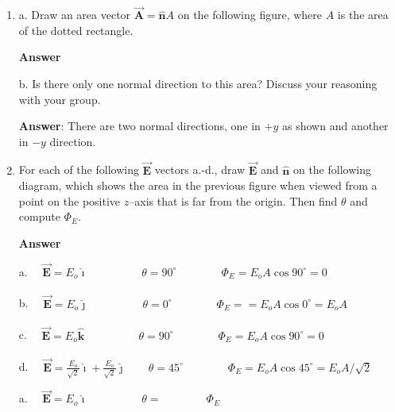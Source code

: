 \documentclass{article}
\newcommand{\ds}[0]{\displaystyle}
\newcommand{\ihat}[0]{\hat{\boldsymbol{\imath}}}
\newcommand{\jhat}[0]{\hat{\boldsymbol{\jmath}}}
\newcommand{\khat}[0]{\hat{\boldsymbol{k}}}
\newcommand{\bfvec}[1]{\vec{\mathbf{#1}}}
\begin{document}
\begin{enumerate}

  \item a. Draw an area vector $\bfvec{A}=\hat{\mathbf{n}}A$ on the following figure, where $A$ is the area of the dotted rectangle.

        \ifsolutions
        \textbf{Answer}

        
        \else

        
        \fi
        \ifsolutions\else
        
        \fi

        b. Is there only one normal direction to this area? Discuss your reasoning with your group.

        \ifsolutions
        \textbf{Answer}: There are two normal directions, one in $+y$ as shown and another in $-y$ direction.
        \else
        \vskip 72pt
        \fi
        \ifsolutions\else
        \vskip 72pt
        \fi

  \item For each of the following $\bfvec{E}$ vectors a.-d., draw $\bfvec{E}$ and $\hat{\mathbf{n}}$ on the following diagram, which shows the area in the previous figure when viewed from a point on the positive $z$--axis that is far from the origin. Then find $\theta$ and compute $\Phi_E$.

        \ifsolutions
        \textbf{Answer}

        

        a. $\quad\ds\bfvec{E}=E_o\ihat\qquad\phantom{+\frac{E_o}{\sqrt{2}}\jhat}\theta=90^\circ\qquad\qquad\Phi_E=E_oA\cos 90^\circ = 0$

        b. $\quad\ds\bfvec{E}=E_o\jhat\qquad\phantom{+ \frac{E_o}{\sqrt{2}}\jhat}\theta=0^\circ\qquad\qquad\Phi_E==E_oA\cos 0^\circ=E_oA$ 

        c. $\quad\ds\bfvec{E}=E_o\khat\qquad\phantom{+\frac{E_o}{\sqrt{2}}\jhat}\theta=90^\circ\qquad\qquad\Phi_E=E_oA\cos 90^\circ=0$ 

        d. $\quad\ds\bfvec{E}=\frac{E_o}{\sqrt{2}}\ihat + \frac{E_o}{\sqrt{2}}\jhat\qquad\theta=45^\circ\qquad\qquad\Phi_E=E_o A\cos 45^\circ=E_oA/\sqrt{2}$
        \else

        

        a. $\quad\ds\bfvec{E}=E_o\ihat\qquad\phantom{+\frac{E_o}{\sqrt{2}}\jhat}\theta=\qquad\qquad\Phi_E$


\end{enumerate}
\end{document}
